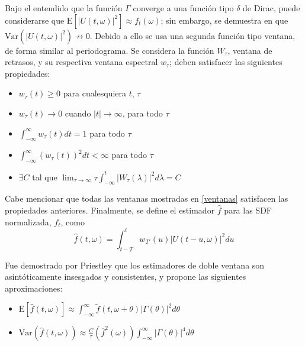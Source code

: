 \documentclass[12pt,a4paper]{mitthesis}
\newcommand{\intR}{\int_{-\infty}^{\infty}}
\newcommand{\dirac}{$\delta$  de Dirac}
\newcommand{\est}[1]{\widehat{ #1 }}
\newcommand{\E}[1]{\mathrm{E}\left[ #1 \right]}
\newcommand{\Var}[1]{\mathrm{Var}\left( #1 \right)}
\newcommand{\abso}[1]{\left| #1 \right|}
\begin{document}
Bajo el entendido que la funci\'on $\Gamma$ converge a una funci\'on tipo \dirac, puede 
considerarse que 
$\E{\abso{U(t,\omega)}^{2}} \approx f_t(\omega)$; sin embargo, se demuestra en \cite{Priestley66} 
que $\Var{\abso{U(t,\omega)}^{2}} \nrightarrow 0$.
%
Debido a ello se usa una segunda funci\'on tipo ventana,
de forma similar al periodograma.
Se considera la funci\'on $W_\tau$, ventana de retrasos, y su respectiva ventana espectral 
$w_\tau$; deben satisfacer las siguientes propiedades:
\begin{itemize}
\item $w_{\tau}(t) \geq 0$ para cualesquiera $t$, $\tau$
\item $w_{\tau}(t) \rightarrow 0$ cuando $\lvert t \lvert \rightarrow \infty$, para todo $\tau$
\item $\displaystyle \int_{-\infty}^{\infty} w_{\tau}(t) dt = 1$ para todo $\tau$
\item $\displaystyle \int_{-\infty}^{\infty} \left( w_{\tau}(t) \right)^{2} dt < \infty$ para todo $\tau$
\item $\exists C$ tal que  
$\displaystyle \lim_{\tau\rightarrow\infty} \tau \int_{-\infty}^{t} \abso{ W_{\tau}(\lambda) }^{2} d\lambda = C$
\end{itemize}

Cabe mencionar que todas las ventanas mostradas en \ref{ventanas} satisfacen las propiedades 
anteriores.
Finalmente, se define el estimador $\est{f}$ para las SDF normalizada, $f_t$, como
\begin{equation*}
\widehat{f}(t,\omega) = \int_{t-T}^{t} w_{T'}(u) \lvert U(t-u,\omega) \lvert^{2} du
\label{estimador_doble_ventana}
\end{equation*}

Fue demostrado por Priestley \cite{Priestley65} que los estimadores de doble ventana son 
asint\'oticamente insesgados y consistentes, y propone las siguientes aproximaciones:
\begin{itemize}
\item $\displaystyle
\E{\est{f}(t,\omega)} \approx 
\intR \widetilde{f}(t,\omega+\theta) \abso{\Gamma(\theta)}^{2} d\theta$
\item $\displaystyle
\Var{\est{f}(t,\omega)} \approx \frac{C}{\tau} \left( \overline{f}^{2}(\omega) \right)
\intR \abso{\Gamma(\theta)}^{4} d\theta $
\end{itemize}
\end{document}
